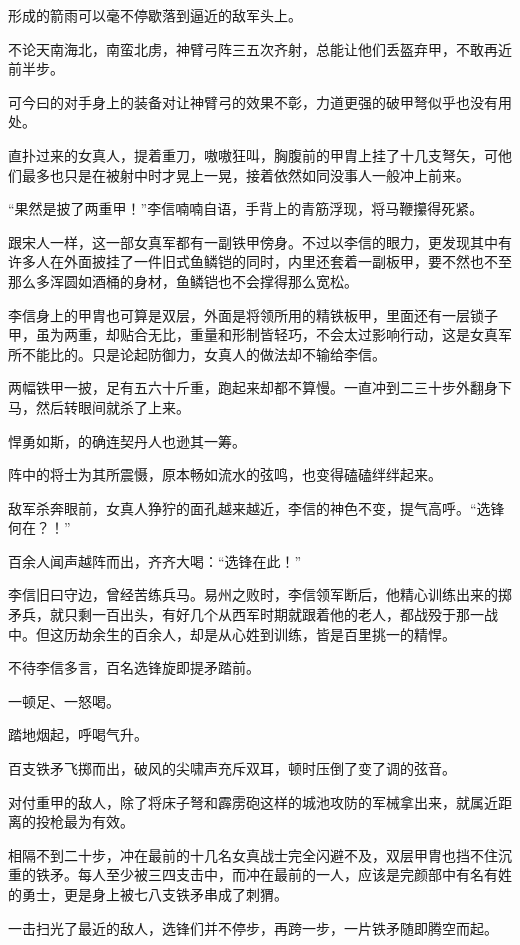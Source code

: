 形成的箭雨可以毫不停歇落到逼近的敌军头上。

不论天南海北，南蛮北虏，神臂弓阵三五次齐射，总能让他们丢盔弃甲，不敢再近前半步。

可今曰的对手身上的装备对让神臂弓的效果不彰，力道更强的破甲弩似乎也没有用处。

直扑过来的女真人，提着重刀，嗷嗷狂叫，胸腹前的甲胄上挂了十几支弩矢，可他们最多也只是在被射中时才晃上一晃，接着依然如同没事人一般冲上前来。

“果然是披了两重甲！”李信喃喃自语，手背上的青筋浮现，将马鞭攥得死紧。

跟宋人一样，这一部女真军都有一副铁甲傍身。不过以李信的眼力，更发现其中有许多人在外面披挂了一件旧式鱼鳞铠的同时，内里还套着一副板甲，要不然也不至那么多浑圆如酒桶的身材，鱼鳞铠也不会撑得那么宽松。

李信身上的甲胄也可算是双层，外面是将领所用的精铁板甲，里面还有一层锁子甲，虽为两重，却贴合无比，重量和形制皆轻巧，不会太过影响行动，这是女真军所不能比的。只是论起防御力，女真人的做法却不输给李信。

两幅铁甲一披，足有五六十斤重，跑起来却都不算慢。一直冲到二三十步外翻身下马，然后转眼间就杀了上来。

悍勇如斯，的确连契丹人也逊其一筹。

阵中的将士为其所震慑，原本畅如流水的弦鸣，也变得磕磕绊绊起来。

敌军杀奔眼前，女真人狰狞的面孔越来越近，李信的神色不变，提气高呼。“选锋何在？！”

百余人闻声越阵而出，齐齐大喝：“选锋在此！”

李信旧曰守边，曾经苦练兵马。易州之败时，李信领军断后，他精心训练出来的掷矛兵，就只剩一百出头，有好几个从西军时期就跟着他的老人，都战殁于那一战中。但这历劫余生的百余人，却是从心姓到训练，皆是百里挑一的精悍。

不待李信多言，百名选锋旋即提矛踏前。

一顿足、一怒喝。

踏地烟起，呼喝气升。

百支铁矛飞掷而出，破风的尖啸声充斥双耳，顿时压倒了变了调的弦音。

对付重甲的敌人，除了将床子弩和霹雳砲这样的城池攻防的军械拿出来，就属近距离的投枪最为有效。

相隔不到二十步，冲在最前的十几名女真战士完全闪避不及，双层甲胄也挡不住沉重的铁矛。每人至少被三四支击中，而冲在最前的一人，应该是完颜部中有名有姓的勇士，更是身上被七八支铁矛串成了刺猬。

一击扫光了最近的敌人，选锋们并不停步，再跨一步，一片铁矛随即腾空而起。

